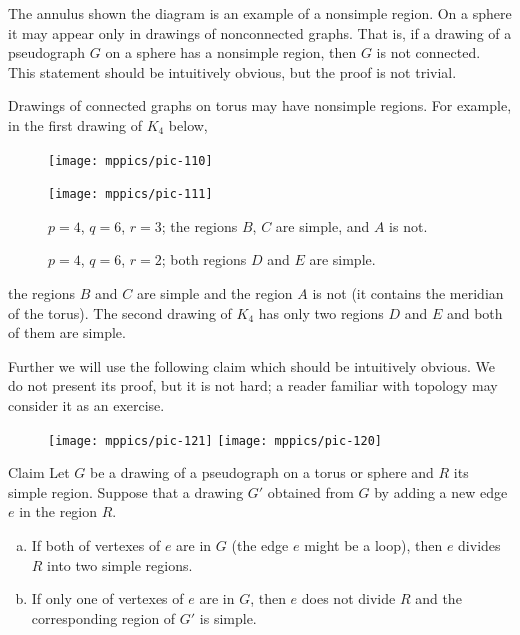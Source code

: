 The annulus shown the diagram is an example of a nonsimple region.
On a sphere it may appear only in drawings of nonconnected graphs.
That is, if a drawing of a pseudograph $G$ on a sphere has a nonsimple region, then $G$ is not connected.
This statement should be intuitively obvious, but the proof is not trivial.  

Drawings of connected graphs on torus may have nonsimple regions.
For example, in the first drawing of $K_4$ below,
\begin{figure}[h!]
\begin{minipage}{.45\textwidth}
\centering
\texttt{[image: mppics/pic-110]}
\end{minipage}
\hfill
\begin{minipage}{.45\textwidth}
\centering
\texttt{[image: mppics/pic-111]}
\end{minipage}

\medskip

\begin{minipage}{.45\textwidth}
\centering
\caption*{$p=4$, $q=6$, $r=3$; the regions $B$, $C$ are simple, and $A$ is not.}
\end{minipage}\hfill
\begin{minipage}{.45\textwidth}
\centering
\caption*{$p=4$, $q=6$, $r=2$; both regions $D$ and $E$ are simple.}
\end{minipage}
\vskip-4mm
\end{figure} 
the regions $B$ and $C$ are simple and the region $A$ is not (it contains the meridian of the torus).
The second drawing of $K_4$ has only two regions $D$ and $E$ and both of them are simple.


Further we will use the following claim which should be intuitively obvious.
We do not present its proof, but it is not hard;
a reader familiar with topology may consider it as an exercise.

{

\begin{figure}
\vskip-4mm
\centering
\texttt{[image: mppics/pic-121]}
\medskip
\texttt{[image: mppics/pic-120]}
\end{figure}

\begin{thm}{Claim}\label{clm:cut}
Let $G$ be a drawing of a pseudograph on a torus or sphere and $R$ its simple region.
Suppose that a drawing $G'$ obtained from $G$ by adding a new edge $e$ in the region $R$.
\begin{enumerate}[(a)]
\item If both of vertexes of $e$ are in $G$ (the edge $e$ might be a loop), then $e$ divides $R$ into two simple regions.
\item If only one of vertexes of $e$ are in $G$, then $e$ does not divide $R$ and the corresponding region of $G'$ is simple.
\end{enumerate}
\end{thm}

}

